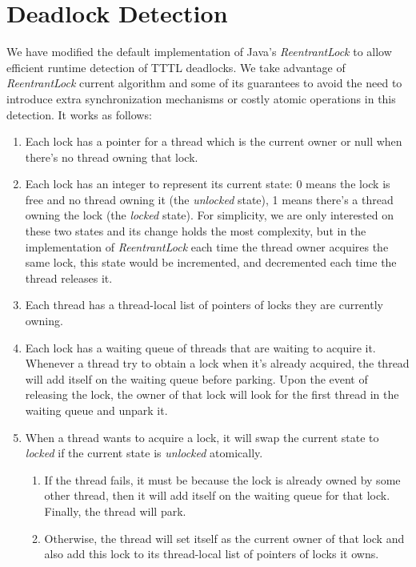 \section{Deadlock Detection}

We have modified the default implementation of Java's \emph{ReentrantLock} to allow efficient runtime detection of TTTL deadlocks. We take advantage of \emph{ReentrantLock} current algorithm and some of its guarantees to avoid the need to introduce extra synchronization mechanisms or costly atomic operations in this detection. It works as follows:

\begin{enumerate}
\item Each lock has a pointer for a thread which is the current owner or null when there's no thread owning that lock.
\item Each lock has an integer to represent its current state: 0 means the lock is free and no thread owning it (the \emph{unlocked} state), 1 means there's a thread owning the lock (the \emph{locked} state). For simplicity, we are only interested on these two states and its change holds the most complexity, but in the implementation of \emph{ReentrantLock} each time the thread owner acquires the same lock, this state would be incremented, and decremented each time the thread releases it.
\item Each thread has a thread-local list of pointers of locks they are currently owning.
\item Each lock has a waiting queue of threads that are waiting to acquire it. Whenever a thread try to obtain a lock when it's already acquired, the thread will add itself on the waiting queue before parking. Upon the event of releasing the lock, the owner of that lock will look for the first thread in the waiting queue and unpark it.
\item When a thread wants to acquire a lock, it will swap the current state to \emph{locked} if the current state is \emph{unlocked} atomically.
\begin{enumerate}
\item If the thread fails, it must be because the lock is already owned by some other thread, then it will add itself on the waiting queue for that lock. Finally, the thread will park.
\item Otherwise, the thread will set itself as the current owner of that lock and also add this lock to its thread-local list of pointers of locks it owns.
\end{enumerate}

\end{enumerate}
